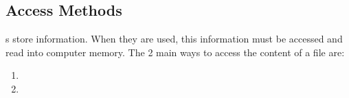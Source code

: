 \subsection{Access Methods}\label{subsec:Access_Methods}
s store information.
When they are used, this information must be accessed and read into computer memory.
The 2 main ways to access the content of a file are:
\begin{enumerate}[noitemsep]
\item {}
\item {}
\end{enumerate}


